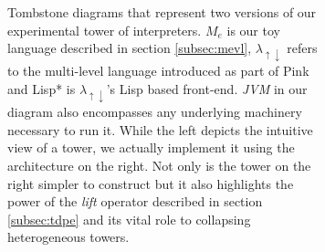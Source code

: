 \documentclass[a4paper,12pt,twoside,openright]{report}
\theoremstyle{definition}
\newcommand{\mslang}{$\lambda_{\uparrow\downarrow}$}
\newcommand{\mevl}{$M_{e}$}
\begin{document}
\begin{figure}[htp!]
\begin{subfigure}[htp!]{\textwidth}
            \caption{Tombstone diagrams that represent two versions of our experimental tower of interpreters. \mevl{} is our toy language described in section \ref{subsec:mevl}, \mslang{} refers to the multi-level language introduced as part of Pink \cite{amin2017collapsing} and Lisp* is \mslang's Lisp based front-end. \textit{JVM} in our diagram also encompasses any underlying machinery necessary to run it. While the left depicts the intuitive view of a tower, we actually implement it using the architecture on the right. Not only is the tower on the right simpler to construct but it also highlights the power of the \textit{lift} operator described in section \ref{subsec:tdpe} and its vital role to collapsing heterogeneous towers.}
            \label{fig:tombstone}
    \end{subfigure}\\[4ex]
    \begin{subfigure}[htp!]{\linewidth}
        \centering
\end{subfigure}
\end{figure}
\end{document}
